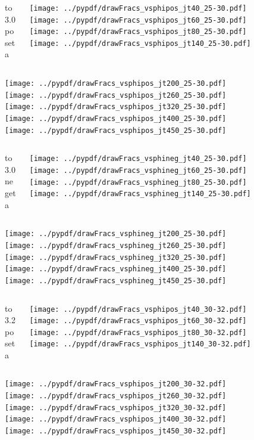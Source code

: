 \documentclass[aspectratio=169]{beamer}
\begin{document}
\begin{figure}[p]
\flushleft
\begin{columns}[T]
\begin{column}{.2\linewidth}
 to 3.0 poseta
\end{column}
\begin{column}{.8\linewidth}
\texttt{[image: ../pypdf/drawFracs\_vsphipos\_jt40\_25-30.pdf]}
\texttt{[image: ../pypdf/drawFracs\_vsphipos\_jt60\_25-30.pdf]}
\texttt{[image: ../pypdf/drawFracs\_vsphipos\_jt80\_25-30.pdf]}
\texttt{[image: ../pypdf/drawFracs\_vsphipos\_jt140\_25-30.pdf]}
\end{column}
\end{columns}
\texttt{[image: ../pypdf/drawFracs\_vsphipos\_jt200\_25-30.pdf]}
\texttt{[image: ../pypdf/drawFracs\_vsphipos\_jt260\_25-30.pdf]}
\texttt{[image: ../pypdf/drawFracs\_vsphipos\_jt320\_25-30.pdf]}
\texttt{[image: ../pypdf/drawFracs\_vsphipos\_jt400\_25-30.pdf]}
\texttt{[image: ../pypdf/drawFracs\_vsphipos\_jt450\_25-30.pdf]}
\end{figure}

\begin{figure}[p]
\flushleft
\begin{columns}[T]
\begin{column}{.2\linewidth}
 to 3.0 negeta
\end{column}
\begin{column}{.8\linewidth}
\texttt{[image: ../pypdf/drawFracs\_vsphineg\_jt40\_25-30.pdf]}
\texttt{[image: ../pypdf/drawFracs\_vsphineg\_jt60\_25-30.pdf]}
\texttt{[image: ../pypdf/drawFracs\_vsphineg\_jt80\_25-30.pdf]}
\texttt{[image: ../pypdf/drawFracs\_vsphineg\_jt140\_25-30.pdf]}
\end{column}
\end{columns}
\texttt{[image: ../pypdf/drawFracs\_vsphineg\_jt200\_25-30.pdf]}
\texttt{[image: ../pypdf/drawFracs\_vsphineg\_jt260\_25-30.pdf]}
\texttt{[image: ../pypdf/drawFracs\_vsphineg\_jt320\_25-30.pdf]}
\texttt{[image: ../pypdf/drawFracs\_vsphineg\_jt400\_25-30.pdf]}
\texttt{[image: ../pypdf/drawFracs\_vsphineg\_jt450\_25-30.pdf]}
\end{figure}

\begin{figure}[p]
\flushleft
\begin{columns}[T]
\begin{column}{.2\linewidth}
 to 3.2 poseta
\end{column}
\begin{column}{.8\linewidth}
\texttt{[image: ../pypdf/drawFracs\_vsphipos\_jt40\_30-32.pdf]}
\texttt{[image: ../pypdf/drawFracs\_vsphipos\_jt60\_30-32.pdf]}
\texttt{[image: ../pypdf/drawFracs\_vsphipos\_jt80\_30-32.pdf]}
\texttt{[image: ../pypdf/drawFracs\_vsphipos\_jt140\_30-32.pdf]}
\end{column}
\end{columns}
\texttt{[image: ../pypdf/drawFracs\_vsphipos\_jt200\_30-32.pdf]}
\texttt{[image: ../pypdf/drawFracs\_vsphipos\_jt260\_30-32.pdf]}
\texttt{[image: ../pypdf/drawFracs\_vsphipos\_jt320\_30-32.pdf]}
\texttt{[image: ../pypdf/drawFracs\_vsphipos\_jt400\_30-32.pdf]}
\texttt{[image: ../pypdf/drawFracs\_vsphipos\_jt450\_30-32.pdf]}
\end{figure}
\end{document}
